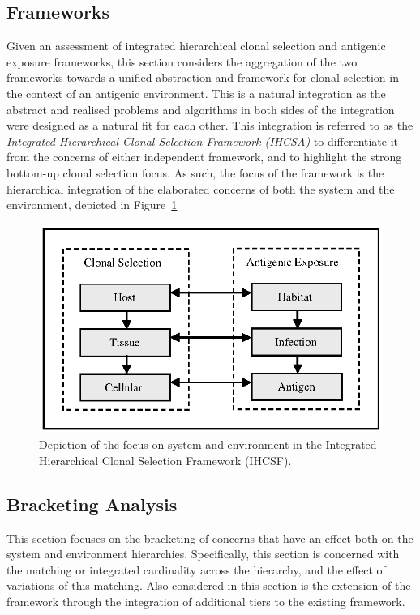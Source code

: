 \subsection{Frameworks}
\label{sec:framework:ihcsf:frameworks}
Given an assessment of integrated hierarchical clonal selection and antigenic exposure frameworks, this section considers the aggregation of the two frameworks towards a unified abstraction and framework for clonal selection in the context of an antigenic environment. This is a natural integration as the abstract and realised problems and algorithms in both sides of the integration were designed as a natural fit for each other.
This integration is referred to as the \emph{Integrated Hierarchical Clonal Selection Framework (IHCSA)} to differentiate it from the concerns of either independent framework, and to highlight the strong bottom-up clonal selection focus. 
As such, the focus of the framework is the hierarchical integration of the elaborated concerns of both the system and the environment, depicted in Figure~\ref{fig:framework:ihcsf:interpretation:expanded-expanded}

\begin{figure}[htp]
	\centering
	\includegraphics[scale=0.85]{Framework/framework-integration-expanded-expanded}
	\caption{Depiction of the focus on system and environment in the Integrated Hierarchical Clonal Selection Framework (IHCSF).}
	\label{fig:framework:ihcsf:interpretation:expanded-expanded}
\end{figure}


%
%
\subsection{Bracketing Analysis}
\label{sec:framework:ihcsf:bracketing}
This section focuses on the bracketing of concerns that have an effect both on the system and environment hierarchies. Specifically, this section is concerned with the matching or integrated cardinality across the hierarchy, and the effect of variations of this matching. Also considered in this section is the extension of the framework through the integration of additional tiers to the existing framework.

